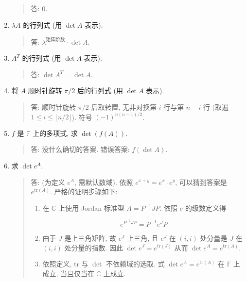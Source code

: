 \documentclass[
]{ctexart}
\begin{document}
\begin{enumerate}
  \begin{quote}
  答: \(0\).
  \end{quote}
\item
  \(\lambda A\) 的行列式 (用 \(\det A\) 表示).

  \begin{quote}
  答: \(\lambda^{\text{矩阵阶数}}\cdot \det A\).
  \end{quote}
\item
  \(A^T\) 的行列式 (用 \(\det A\) 表示).

  \begin{quote}
  答: \(\det A^T=\det A\).
  \end{quote}
\item
  将 \(A\) 顺时针旋转 \(\pi/2\) 后的行列式 (用 \(\det A\) 表示).

  \begin{quote}
  答: 顺时针旋转 \(\pi/2\) 后取转置, 无非对换第 \(i\) 行与第 \(n-i\) 行
  (取遍 \(1\leq i\leq \lfloor n/2\rfloor\)). 符号 \((-1)^{n(n-1)/2}\).
  \end{quote}
\item
  \(f\) 是 \(\mathbb F\) 上的多项式, 求 \(\det (f(A))\).

  \begin{quote}
  答: 没什么确切的答案. 错误答案: \(f(\det A)\).
  \end{quote}
\item
  求 \(\det e^A\).

  \begin{quote}
  答: (为定义 \(e^A\), 需默认数域). 依照 \(e^{x+y}=e^x\cdot e^y\),
  可以猜到答案是 \(e^{\mathrm{tr}(A)}\). 严格的证明步骤如下:

  \begin{enumerate}
  \def\labelenumii{\arabic{enumii}.}
  \item
    在 \(\mathbb C\) 上使用 Jordan 标准型 \(A=P^{-1}JP\). 依照 \(e\)
    的级数定义得

    \[e^{P^{-1}JP}=P^{-1}e^JP\]
  \item
    由于 \(J\) 是上三角矩阵, 故 \(e^J\) 上三角, 且 \(e^J\) 在 \((i,i)\)
    处分量是 \(J\) 在 \((i,i)\) 处分量的指数. 因此
    \(\det e^J=e^{\mathrm{tr}(J)}\) 从而
    \(\det e^A=e^{\mathrm{tr}(A)}\).
  \item
    依照定义, \(\mathrm{tr}\) 与 \(\det\) 不依赖域的选取. 式
    \(\det e^A=e^{\mathrm{tr}(A)}\) 在 \(\mathbb F\) 上成立, 当且仅当在
    \(\mathbb C\) 上成立.
  \end{enumerate}
  \end{quote}
\end{enumerate}
\end{document}
